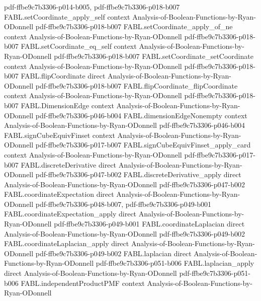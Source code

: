 \begin{theorem}
  {pdf-ffbe9c7b3306-p014-b005,
    pdf-ffbe9c7b3306-p018-b007}
\proofstep
  {FABL.setCoordinate_apply_self}
  {context}
  {Analysis-of-Boolean-Functions-by-Ryan-ODonnell}
  {pdf-ffbe9c7b3306-p018-b007}
\proofstep
  {FABL.setCoordinate_apply_of_ne}
  {context}
  {Analysis-of-Boolean-Functions-by-Ryan-ODonnell}
  {pdf-ffbe9c7b3306-p018-b007}
\proofstep
  {FABL.setCoordinate_eq_self}
  {context}
  {Analysis-of-Boolean-Functions-by-Ryan-ODonnell}
  {pdf-ffbe9c7b3306-p018-b007}
\proofstep
  {FABL.setCoordinate_setCoordinate}
  {context}
  {Analysis-of-Boolean-Functions-by-Ryan-ODonnell}
  {pdf-ffbe9c7b3306-p018-b007}
\proofstep
  {FABL.flipCoordinate}
  {direct}
  {Analysis-of-Boolean-Functions-by-Ryan-ODonnell}
  {pdf-ffbe9c7b3306-p018-b007}
\proofstep
  {FABL.flipCoordinate_flipCoordinate}
  {context}
  {Analysis-of-Boolean-Functions-by-Ryan-ODonnell}
  {pdf-ffbe9c7b3306-p018-b007}
\proofstep
  {FABL.DimensionEdge}
  {context}
  {Analysis-of-Boolean-Functions-by-Ryan-ODonnell}
  {pdf-ffbe9c7b3306-p046-b004}
\proofstep
  {FABL.dimensionEdgeNonempty}
  {context}
  {Analysis-of-Boolean-Functions-by-Ryan-ODonnell}
  {pdf-ffbe9c7b3306-p046-b004}
\proofstep
  {FABL.signCubeEquivFinset}
  {context}
  {Analysis-of-Boolean-Functions-by-Ryan-ODonnell}
  {pdf-ffbe9c7b3306-p017-b007}
\proofstep
  {FABL.signCubeEquivFinset_apply_card}
  {context}
  {Analysis-of-Boolean-Functions-by-Ryan-ODonnell}
  {pdf-ffbe9c7b3306-p017-b007}
\proofstep
  {FABL.discreteDerivative}
  {direct}
  {Analysis-of-Boolean-Functions-by-Ryan-ODonnell}
  {pdf-ffbe9c7b3306-p047-b002}
\proofstep
  {FABL.discreteDerivative_apply}
  {direct}
  {Analysis-of-Boolean-Functions-by-Ryan-ODonnell}
  {pdf-ffbe9c7b3306-p047-b002}
\proofstep
  {FABL.coordinateExpectation}
  {direct}
  {Analysis-of-Boolean-Functions-by-Ryan-ODonnell}
  {pdf-ffbe9c7b3306-p048-b007,
    pdf-ffbe9c7b3306-p049-b001}
\proofstep
  {FABL.coordinateExpectation_apply}
  {direct}
  {Analysis-of-Boolean-Functions-by-Ryan-ODonnell}
  {pdf-ffbe9c7b3306-p049-b001}
\proofstep
  {FABL.coordinateLaplacian}
  {direct}
  {Analysis-of-Boolean-Functions-by-Ryan-ODonnell}
  {pdf-ffbe9c7b3306-p049-b002}
\proofstep
  {FABL.coordinateLaplacian_apply}
  {direct}
  {Analysis-of-Boolean-Functions-by-Ryan-ODonnell}
  {pdf-ffbe9c7b3306-p049-b002}
\proofstep
  {FABL.laplacian}
  {direct}
  {Analysis-of-Boolean-Functions-by-Ryan-ODonnell}
  {pdf-ffbe9c7b3306-p051-b006}
\proofstep
  {FABL.laplacian_apply}
  {direct}
  {Analysis-of-Boolean-Functions-by-Ryan-ODonnell}
  {pdf-ffbe9c7b3306-p051-b006}
\proofstep
  {FABL.independentProductPMF}
  {context}
  {Analysis-of-Boolean-Functions-by-Ryan-ODonnell}

\end{theorem}

